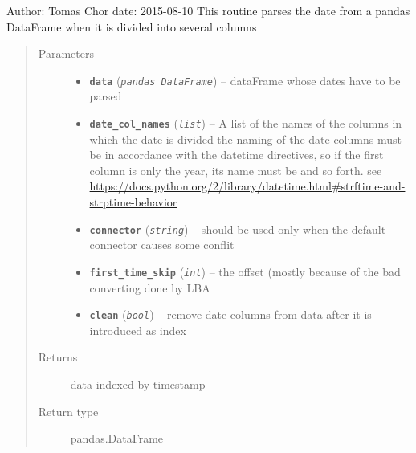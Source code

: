 \documentclass[a4paper,10pt,oneside]{sphinxmanual}
\begin{document}
\begin{fulllineitems}
\label{pymicra.algs:pymicra.algs.general.parseDates}
Author: Tomas Chor
date: 2015-08-10
This routine parses the date from a pandas DataFrame when it is divided into several columns
\begin{quote}\begin{description}
\item[{Parameters}] \leavevmode\begin{itemize}
\item {} 
\textbf{\texttt{data}} (\emph{\texttt{pandas DataFrame}}) -- dataFrame whose dates have to be parsed

\item {} 
\textbf{\texttt{date\_col\_names}} (\emph{\texttt{list}}) -- A list of the names of the columns in which the date is divided
the naming of the date columns must be in accordance with the datetime directives,
so if the first column is only the year, its name must be  and so forth.
see \url{https://docs.python.org/2/library/datetime.html\#strftime-and-strptime-behavior}

\item {} 
\textbf{\texttt{connector}} (\emph{\texttt{string}}) -- should be used only when the default connector causes some conflit

\item {} 
\textbf{\texttt{first\_time\_skip}} (\emph{\texttt{int}}) -- the offset (mostly because of the bad converting done by LBA

\item {} 
\textbf{\texttt{clean}} (\emph{\texttt{bool}}) -- remove date columns from data after it is introduced as index

\end{itemize}

\item[{Returns}] \leavevmode
data indexed by timestamp

\item[{Return type}] \leavevmode
pandas.DataFrame

\end{description}\end{quote}

\end{fulllineitems}
\end{document}
